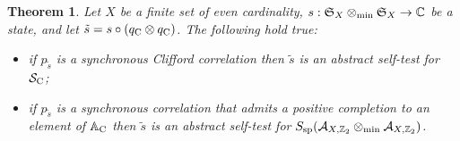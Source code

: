 \documentclass[11pt]{amsart}
\newtheorem{theorem}{Theorem}[section]
\theoremstyle{definition}
\newcommand{\cl}[1]{\mathcal{#1}}
\newcommand{\bb}[1]{\mathbb{#1}}
\begin{document}



\begin{theorem}\label{p_syncste}
Let $X$ be a finite set of even cardinality,  
$s : \frak{S}_{X} \otimes_{\min} \frak{S}_{X}
\to \bb{C}$ be a state, and let 
$\tilde{s} = 
s\circ (q_{\rm C}\otimes q_{\rm C})$. 
The following hold true:

\begin{itemize}
\item[(i)]
if $p_{\tilde{s}}$ is a synchronous Clifford correlation then 
$\tilde{s}$ is an abstract self-test for $\cl S_{\rm C}$;


\item[(ii)] if $p_{\tilde{s}}$ is a synchronous correlation
that admits a positive completion to an element of $\bb{A}_{\rm C}$ then 
$\tilde{s}$ is an abstract self-test for 
$S_{\rm sp}(\cl A_{X,\bb{Z}_2}\otimes_{\min} \cl A_{X,\bb{Z}_2})$.
\end{itemize}
\end{theorem}
\end{document}
